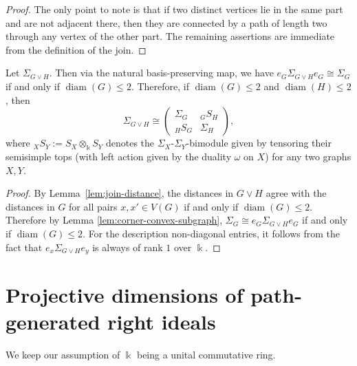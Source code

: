 \documentclass[a4paper,leqno]{amsart}
\begin{document}
\begin{proof}
The only point to note is that if two distinct vertices lie in the same
part and are not adjacent there, then they are connected by a path of
length two through any vertex of the other part. The remaining assertions are immediate from the definition of the join.
\end{proof}

\begin{prop}\label{prop:join-matrix}
Let $\Sigma_{G\vee H}$.
Then via the natural basis-preserving map, we have
$e_G\Sigma_{G\vee H}e_G\cong \Sigma_G$ if and only if $\operatorname{diam}(G)\leq 2$. Therefore, if $\operatorname{diam}(G)\leq 2$ and $\operatorname{diam}(H)\leq 2$, then
\[\Sigma_{G\vee H}\cong\begin{pmatrix}
\Sigma_G & {}_GS_H\\
{}_HS_G &\Sigma_H
\end{pmatrix},\]
where ${}_XS_Y:= S_X\otimes_{\Bbbk} S_Y$ denotes the $\Sigma_X$-$\Sigma_Y$-bimodule given by tensoring their semisimple tops (with left action given by the duality $\omega$ on $X$) for any two graphs $X,Y$.
\end{prop}

\begin{proof}
By Lemma~\ref{lem:join-distance}, the distances in $G\vee H$ agree with the distances in $G$ for all pairs $x,x'\in V(G)$ if and only if $\operatorname{diam}(G)\leq 2$.
Therefore by Lemma \ref{lem:corner-convex-subgraph}, $\Sigma_G\cong e_G\Sigma_{G\vee H}e_G$ if and only if $\operatorname{diam}(G)\leq 2$.
For the description non-diagonal entries, it follows from the fact that $e_x \Sigma_{G\vee H} e_y$ is always of rank $1$ over $\Bbbk$.
\end{proof}



\section{Projective dimensions of path-generated right ideals}\label{sec:4-proj-dim}


We keep our assumption of $\Bbbk$ being a unital commutative ring.
\end{document}
